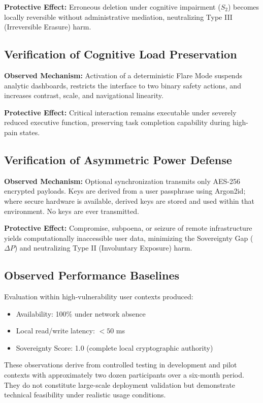 \documentclass[acmsmall,review]{acmart}
\begin{document}
\textbf{Protective Effect:} Erroneous deletion under cognitive impairment ($S_2$) becomes locally reversible without administrative mediation, neutralizing Type III (Irreversible Erasure) harm.

\subsection{Verification of Cognitive Load Preservation}

\textbf{Observed Mechanism:} Activation of a deterministic Flare Mode suspends analytic dashboards, restricts the interface to two binary safety actions, and increases contrast, scale, and navigational linearity.

\textbf{Protective Effect:} Critical interaction remains executable under severely reduced executive function, preserving task completion capability during high-pain states.

\subsection{Verification of Asymmetric Power Defense}

\textbf{Observed Mechanism:} Optional synchronization transmits only AES-256 encrypted payloads. Keys are derived from a user passphrase using Argon2id; where secure hardware is available, derived keys are stored and used within that environment. No keys are ever transmitted.

\textbf{Protective Effect:} Compromise, subpoena, or seizure of remote infrastructure yields computationally inaccessible user data, minimizing the Sovereignty Gap ($\Delta P$) and neutralizing Type II (Involuntary Exposure) harm.

\subsection{Observed Performance Baselines}

Evaluation within high-vulnerability user contexts produced:

\begin{itemize}
    \item Availability: 100\% under network absence
    \item Local read/write latency: $< 50$ ms
    \item Sovereignty Score: 1.0 (complete local cryptographic authority)
\end{itemize}

These observations derive from controlled testing in development and pilot contexts with approximately two dozen participants over a six-month period. They do not constitute large-scale deployment validation but demonstrate technical feasibility under realistic usage conditions.
\end{document}
